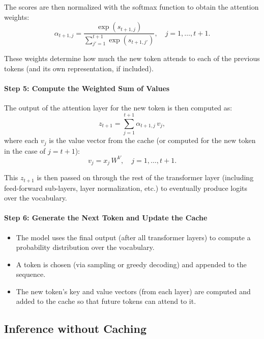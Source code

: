 The scores are then normalized with the softmax function to obtain the attention weights:
\[
\alpha_{t+1,j} = \frac{\exp(s_{t+1,j})}{\sum_{j'=1}^{t+1} \exp(s_{t+1,j'})}, \quad j = 1,\dots,t+1.
\]

These weights determine how much the new token attends to each of the previous tokens (and its own representation, if included).

\paragraph{Step 5: Compute the Weighted Sum of Values}

The output of the attention layer for the new token is then computed as:
\[
z_{t+1} = \sum_{j=1}^{t+1} \alpha_{t+1,j}\, v_j,
\]
where each \( v_j \) is the value vector from the cache (or computed for the new token in the case of \( j=t+1 \)):
\[
v_j = x_j\, W^V, \quad j = 1,\dots,t+1.
\]

This \( z_{t+1} \) is then passed on through the rest of the transformer layer (including feed-forward sub-layers, layer normalization, etc.) to eventually produce logits over the vocabulary.

\paragraph{Step 6: Generate the Next Token and Update the Cache}
\begin{itemize}
	\item The model uses the final output (after all transformer layers) to compute a probability distribution over the vocabulary.
	\item A token is chosen (\eg via sampling or greedy decoding) and appended to the sequence.
	\item The new token's key and value vectors (from each layer) are computed and added to the cache so that future tokens can attend to it.
\end{itemize}

\subsection{Inference without Caching}


